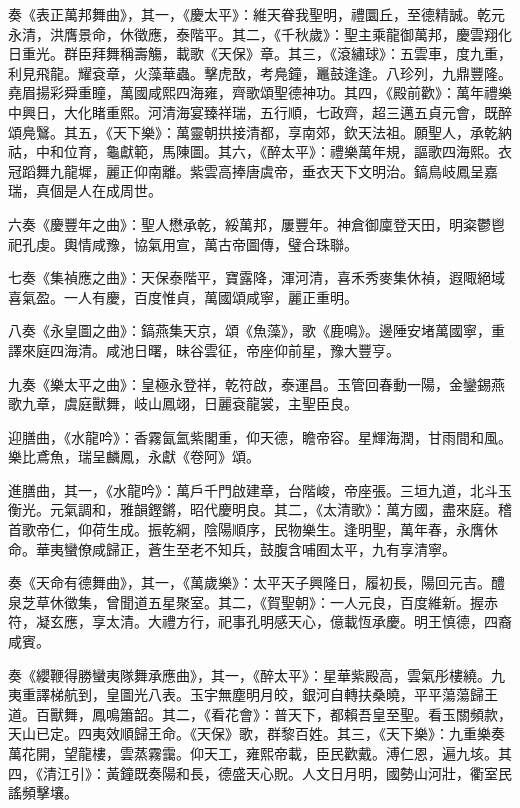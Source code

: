 奏《表正萬邦舞曲》，其一，《慶太平》：維天眷我聖明，禮圜丘，至德精誠。乾元永清，洪膺景命，休徵應，泰階平。其二，《千秋歲》：聖主乘龍御萬邦，慶雲翔化日重光。群臣拜舞稱壽觴，載歌《天保》章。其三，《滾繡球》：五雲車，度九重，利見飛龍。耀袞章，火藻華蟲。擊虎敔，考鳧鐘，鼉鼓逢逢。八珍列，九鼎豐隆。堯眉揚彩舜重瞳，萬國咸熙四海雍，齊歌頌聖德神功。其四，《殿前歡》：萬年禮樂中興日，大化睹重熙。河清海宴臻祥瑞，五行順，七政齊，超三邁五貞元會，既醉頌鳧鷖。其五，《天下樂》：萬靈朝拱接清都，享南郊，欽天法祖。願聖人，承乾納祜，中和位育，龜獻範，馬陳圖。其六，《醉太平》：禮樂萬年規，謳歌四海熙。衣冠蹈舞九龍墀，麗正仰南離。紫雲高捧唐虞帝，垂衣天下文明治。鎬鳥岐鳳呈嘉瑞，真個是人在成周世。

六奏《慶豐年之曲》：聖人懋承乾，綏萬邦，屢豐年。神倉御廩登天田，明粢鬱鬯祀孔虔。輿情咸豫，協氣用宣，萬古帝圖傳，璧合珠聯。

七奏《集禎應之曲》：天保泰階平，寶露降，渾河清，喜禾秀麥集休禎，遐陬絕域喜氣盈。一人有慶，百度惟貞，萬國頌咸寧，麗正重明。

八奏《永皇圖之曲》：鎬燕集天京，頌《魚藻》，歌《鹿鳴》。邊陲安堵萬國寧，重譯來庭四海清。咸池日曙，昧谷雲征，帝座仰前星，豫大豐亨。

九奏《樂太平之曲》：皇極永登祥，乾符啟，泰運昌。玉管回春動一陽，金鑾錫燕歌九章，虞庭獸舞，岐山鳳翊，日麗袞龍裳，主聖臣良。

迎膳曲，《水龍吟》：香霧氤氳紫閣重，仰天德，瞻帝容。星輝海潤，甘雨間和風。樂比鳶魚，瑞呈麟鳳，永獻《卷阿》頌。

進膳曲，其一，《水龍吟》：萬戶千門啟建章，台階峻，帝座張。三垣九道，北斗玉衡光。元氣調和，雅韻鏗鏘，昭代慶明良。其二，《太清歌》：萬方國，盡來庭。稽首歌帝仁，仰荷生成。振乾綱，陰陽順序，民物樂生。逢明聖，萬年春，永膺休命。華夷蠻僚咸歸正，蒼生至老不知兵，鼓腹含哺囿太平，九有享清寧。

奏《天命有德舞曲》，其一，《萬歲樂》：太平天子興隆日，履初長，陽回元吉。醴泉芝草休徵集，曾聞道五星聚室。其二，《賀聖朝》：一人元良，百度維新。握赤符，凝玄應，享太清。大禮方行，祀事孔明感天心，億載恆承慶。明王慎德，四裔咸賓。

奏《纓鞭得勝蠻夷隊舞承應曲》，其一，《醉太平》：星華紫殿高，雲氣彤樓繞。九夷重譯梯航到，皇圖光八表。玉宇無塵明月皎，銀河自轉扶桑曉，平平蕩蕩歸王道。百獸舞，鳳鳴簫韶。其二，《看花會》：普天下，都賴吾皇至聖。看玉關頻款，天山已定。四夷效順歸王命。《天保》歌，群黎百姓。其三，《天下樂》：九重樂奏萬花開，望龍樓，雲蒸霧靄。仰天工，雍熙帝載，臣民歡戴。溥仁恩，遍九垓。其四，《清江引》：黃鐘既奏陽和長，德盛天心貺。人文日月明，國勢山河壯，衢室民謠頻擊壤。

